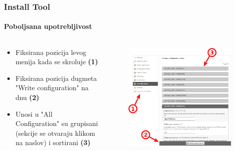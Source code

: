 
\begin{frame}[fragile]
	\frametitle{Install Tool}
	\framesubtitle{Poboljsana upotrebljivost}

	\begin{columns}[T]
		\begin{column}{.5\textwidth}

			\begin{itemize}
				\item Fiksirana pozicija levog menija kada se skroluje 
					\begingroup\color{typo3red}\textbf{(1)}\endgroup
				\item Fiksirana pozicija dugmeta "Write configuration" na dnu
					\begingroup\color{typo3red}\textbf{(2)}\endgroup
				\item Unosi u "All Configuration" su grupisani (sekcije se otvaraju klikom na naslov) i sortirani
					\begingroup\color{typo3red}\textbf{(3)}\endgroup
			\end{itemize}

		\end{column}
		\begin{column}{.5\textwidth}

			\begin{figure}\vspace*{-0.4cm}
				\includegraphics[width=0.8\linewidth]{Images/InstallTool/ImprovedUsability.png}
			\end{figure}

		\end{column}
	\end{columns}

\end{frame}

